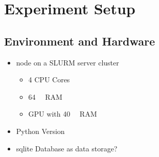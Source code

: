 \chapter{Experiment Setup}
\label{sec:experiment_setup}


\section{Environment and Hardware}
\label{sec:experiment_setup:environment_hardware}

\begin{itemize}
  \item node on a SLURM server cluster
        \begin{itemize}
          \item 4 CPU Cores %
          \item \SI{64}{\giga\byte} RAM %
          \item GPU with \SI{40}{\giga\byte} RAM
        \end{itemize}
  \item Python Version
  \item sqlite Database as data storage?
\end{itemize}